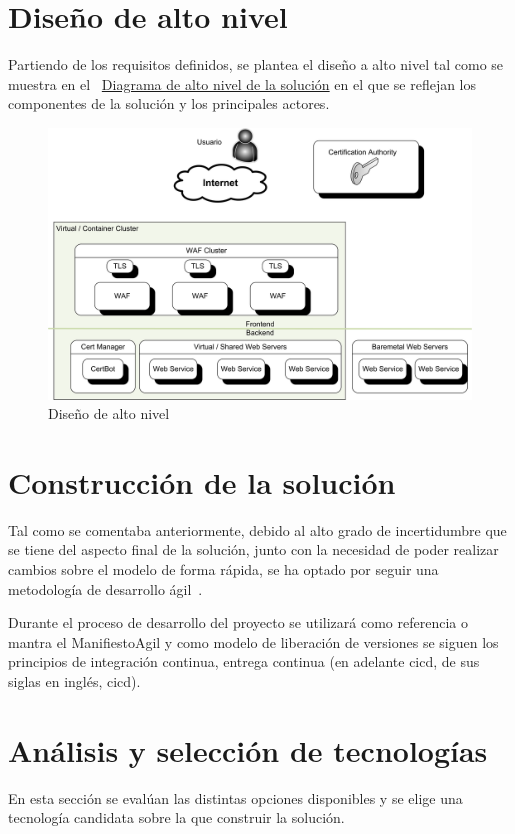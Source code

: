 \section{Diseño de alto nivel}
\par Partiendo de los requisitos definidos, se plantea el diseño a alto nivel tal como se muestra en el {~\hyperref[fig:hld]{Diagrama de alto nivel de la solución}} en el que se reflejan los componentes de la solución y
los principales actores.
\begin{figure}[h!]
  \centering
  \label{fig:hld}
  \includegraphics[width=\textwidth]{fig/Diagram_HLD}
  \caption{Diseño de alto nivel}
\end{figure}

\section{Construcción de la solución}
\par Tal como se comentaba anteriormente, debido al alto grado de incertidumbre que se tiene del aspecto final de la solución, junto con la necesidad de poder
realizar cambios sobre el modelo de forma rápida, se ha optado por seguir una metodología de desarrollo ágil~\cite{wiki:agil}.
\par Durante el proceso de desarrollo del proyecto se utilizará como referencia o mantra el \Gls{ManifiestoAgil} y como modelo de liberación de versiones se
siguen los principios de integración continua, entrega continua (en adelante \acrshort{cicd}, de sus siglas en inglés, \acrlong{cicd}).

\section{Análisis y selección de tecnologías}
\par En esta sección se evalúan las distintas opciones disponibles y se elige una tecnología candidata sobre la que construir la solución.
